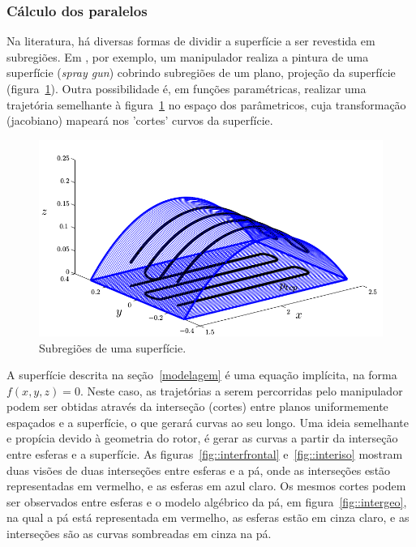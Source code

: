 \subsubsection{Cálculo dos paralelos}\label{paralelos}
Na literatura, há diversas formas de dividir a superfície a ser revestida em
subregiões. Em \cite{from2010off}, por exemplo, um manipulador realiza a pintura
de uma superfície (\textit{spray gun}) cobrindo subregiões de um plano, projeção
 da superfície (figura~\ref{fig::pal}). Outra possibilidade é,
em funções
paramétricas, realizar uma trajetória semelhante à figura~\ref{fig::pal} no
espaço dos parâmetricos, cuja transformação (jacobiano) mapeará nos 'cortes' curvos da
superfície.

\begin{figure}[!ht]
	\centering	
	\includegraphics[width=\columnwidth]{method/figs/planejamento/pal.png}
	\caption{Subregiões de uma superfície.}
	\label{fig::pal}
\end{figure}



A superfície descrita na seção~\ref{modelagem} é uma equação implícita, na forma
$f(x,y,z)=0$. Neste caso, as trajetórias a serem percorridas pelo manipulador
podem ser obtidas através da interseção (cortes) entre planos uniformemente
espaçados e a superfície, o que gerará curvas ao seu longo. Uma
ideia semelhante e propícia devido à geometria do rotor, é gerar as curvas a partir da interseção
entre esferas e a superfície. As figuras~\ref{fig::interfrontal}
e~\ref{fig::interiso} mostram duas visões de duas interseções entre esferas e
a pá, onde as interseções estão representadas em vermelho, e as esferas em
azul claro. Os mesmos cortes podem ser observados entre esferas e o modelo
algébrico da pá, em figura~\ref{fig::intergeo}, na qual a pá está representada
em vermelho, as esferas estão em cinza claro, e as interseções são as curvas
sombreadas em cinza na pá.

